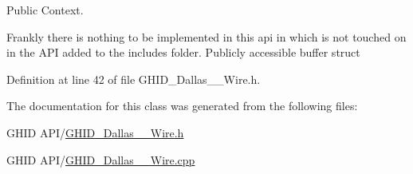 \-Public \-Context. 

\-Frankly there is nothing to be implemented in this api in which is not touched on in the \-A\-P\-I added to the includes folder. \-Publicly accessible buffer struct 

\-Definition at line 42 of file \-G\-H\-I\-D\-\_\-\-Dallas\-\_\-\_\-\-Wire.\-h.



\-The documentation for this class was generated from the following files\-:\begin{DoxyCompactItemize}
\item 
\-G\-H\-I\-D A\-P\-I/\hyperlink{_g_h_i_d___dallas__1___wire_8h}{\-G\-H\-I\-D\-\_\-\-Dallas\-\_\-\_\-\-Wire.\-h}\item 
\-G\-H\-I\-D A\-P\-I/\hyperlink{_g_h_i_d___dallas__1___wire_8cpp}{\-G\-H\-I\-D\-\_\-\-Dallas\-\_\-\_\-\-Wire.\-cpp}\end{DoxyCompactItemize}
